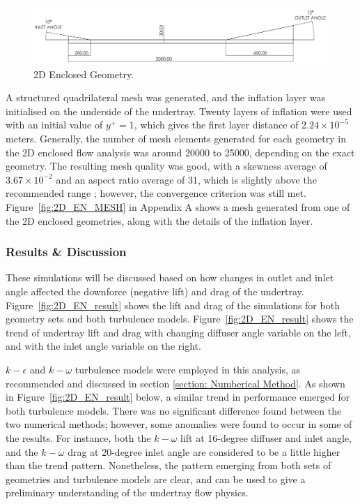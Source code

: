 \begin{figure}[!ht]
    \centering
    \includegraphics[scale=0.18]{Figures/2D_EN/2D_EN_D.PNG}
    \caption{2D Enclosed Geometry.}
    \label{fig:2D_EN_Geom}
\end{figure}
  
\noindent A structured quadrilateral mesh was generated, and the inflation layer was initialised on the underside of the undertray. Twenty layers of inflation were used with an initial value of $y^+ = 1$, which gives the first layer distance of $2.24 \times 10^{-5}$ meters. Generally, the number of mesh elements generated for each geometry in the 2D enclosed flow analysis was around 20000 to 25000, depending on the exact geometry. The resulting mesh quality was good, with a skewness average of $3.67 \times 10^{-2}$ and an aspect ratio average of $31$, which is slightly above the recommended range \cite{Lanfrit2005BestFLUENT}; however, the convergence criterion was still met. Figure~\ref{fig:2D_EN_MESH} in Appendix A shows a mesh generated from one of the 2D enclosed geometries, along with the details of the inflation layer.

\subsubsection{Results \& Discussion}
These simulations will be discussed based on how changes in outlet and inlet angle affected the downforce (negative lift) and drag of the undertray. Figure~\ref{fig:2D_EN_result} shows the lift and drag of the simulations for both geometry sets and both turbulence models. Figure~\ref{fig:2D_EN_result} shows the trend of undertray lift and drag with changing diffuser angle variable on the left, and with the inlet angle variable on the right. 

\noindent $k-\epsilon$ and $k-\omega$ turbulence models were employed in this analysis, as recommended\cite{} and discussed in section \ref{section: Numberical Method}. As shown in Figure~\ref{fig:2D_EN_result} below, a similar trend in performance emerged for both turbulence models. There was no significant difference found between the two numerical methods; however, some anomalies were found to occur in some of the results. For instance, both the $k-\omega$ lift at 16-degree diffuser and inlet angle, and the $k-\omega$ drag at 20-degree inlet angle are considered to be a little higher than the trend pattern. Nonetheless, the pattern emerging from both sets of geometries and turbulence models are clear, and can be used to give a preliminary understanding of the undertray flow physics.

